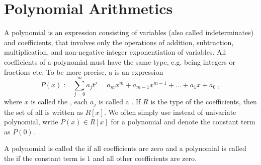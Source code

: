 \section{Polynomial Arithmetics}
A polynomial is an expression consisting of variables (also called indeterminates) and coefficients, that involves only the operations of addition, subtraction, multiplication, and non-negative integer exponentiation of variables. All coefficients of a polynomial must have the same type, e.g. being integers or fractions etc. To be more precise, a  is an expression
\begin{equation}
P(x) := \sum _{j = 0} ^{m}{a} _{j}{t} ^{j} ={a} _{m}x^m +{a} _{m-1} x^{m-1} + \dots + a_1 x + a_0 \;,
\end{equation}
where $x$ is called the , each $ a_j$ is called a . If $R$ is the type of the coefficients, then the set of all  is written as $R[x]$. We often simply use  instead of univariate polynomial, write $ P (x) \in R[x]$ for a polynomial and denote the constant term as $ P(0)$. 

A polynomial is called the  if all coefficients are zero and a polynomial is called the  if the constant term is $1$ and all other coefficients are zero.


